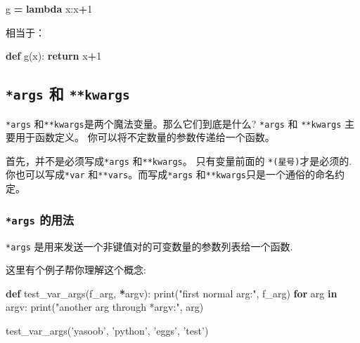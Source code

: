 \documentclass[]{ctexbook}
\newenvironment{Shaded}{\begin{snugshade}}{\end{snugshade}}
\newcommand{\BuiltInTok}[1]{#1}
\newcommand{\ControlFlowTok}[1]{\textcolor[rgb]{0.13,0.29,0.53}{\textbf{#1}}}
\newcommand{\DecValTok}[1]{\textcolor[rgb]{0.00,0.00,0.81}{#1}}
\newcommand{\KeywordTok}[1]{\textcolor[rgb]{0.13,0.29,0.53}{\textbf{#1}}}
\newcommand{\NormalTok}[1]{#1}
\newcommand{\OperatorTok}[1]{\textcolor[rgb]{0.81,0.36,0.00}{\textbf{#1}}}
\newcommand{\StringTok}[1]{\textcolor[rgb]{0.31,0.60,0.02}{#1}}
\begin{document}
\begin{Shaded}
\begin{Highlighting}[]
\NormalTok{g }\OperatorTok{=} \KeywordTok{lambda}\NormalTok{ x:x}\OperatorTok{+}\DecValTok{1}
\end{Highlighting}
\end{Shaded}

相当于：

\begin{Shaded}
\begin{Highlighting}[]
\KeywordTok{def}\NormalTok{ g(x):}
    \ControlFlowTok{return}\NormalTok{ x}\OperatorTok{+}\DecValTok{1}
\end{Highlighting}
\end{Shaded}

\hypertarget{args-ux548c-kwargs}{%
\subsection{\texorpdfstring{\texttt{*args} 和 \texttt{**kwargs}}{*args 和 **kwargs}}\label{args-ux548c-kwargs}}

\texttt{*args} 和\texttt{**kwargs}是两个魔法变量。那么它们到底是什么? \texttt{*args} 和 \texttt{**kwargs} 主要用于函数定义。 你可以将不定数量的参数传递给一个函数。

首先，并不是必须写成\texttt{*args} 和\texttt{**kwargs}。 只有变量前面的 \texttt{*(星号)}才是必须的. 你也可以写成\texttt{*var} 和\texttt{**vars}。而写成\texttt{*args} 和\texttt{**kwargs}只是一个通俗的命名约定。

\hypertarget{args-ux7684ux7528ux6cd5}{%
\subsubsection{\texorpdfstring{\texttt{*args} 的用法}{*args 的用法}}\label{args-ux7684ux7528ux6cd5}}

\texttt{*args} 是用来发送一个非键值对的可变数量的参数列表给一个函数.

这里有个例子帮你理解这个概念:

\begin{Shaded}
\begin{Highlighting}[]
\KeywordTok{def}\NormalTok{ test_var_args(f_arg, }\OperatorTok{*}\NormalTok{argv):}
    \BuiltInTok{print}\NormalTok{(}\StringTok{"first normal arg:"}\NormalTok{, f_arg)}
    \ControlFlowTok{for}\NormalTok{ arg }\KeywordTok{in}\NormalTok{ argv:}
        \BuiltInTok{print}\NormalTok{(}\StringTok{"another arg through *argv:"}\NormalTok{, arg)}

\NormalTok{test_var_args(}\StringTok{'yasoob'}\NormalTok{, }\StringTok{'python'}\NormalTok{, }\StringTok{'eggs'}\NormalTok{, }\StringTok{'test'}\NormalTok{)}
\end{Highlighting}
\end{Shaded}
\end{document}
